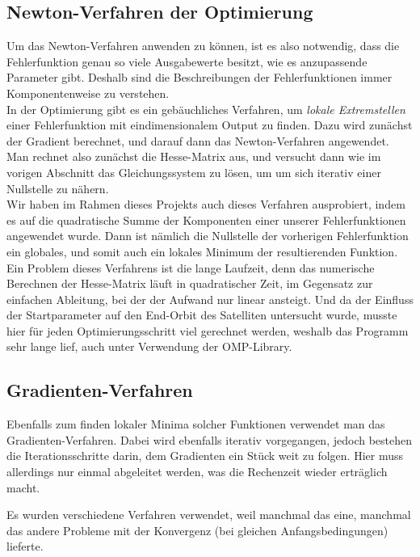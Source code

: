 \subsection{Newton-Verfahren der Optimierung}

Um das Newton-Verfahren anwenden zu können, ist es also notwendig, dass die Fehlerfunktion genau so viele Ausgabewerte besitzt, wie es anzupassende Parameter gibt. Deshalb sind die Beschreibungen der Fehlerfunktionen immer Komponentenweise zu verstehen.\\
In der Optimierung gibt es ein gebäuchliches Verfahren, um \textit{lokale Extremstellen} einer Fehlerfunktion mit eindimensionalem Output zu finden. Dazu wird zunächst der Gradient berechnet, und darauf dann das Newton-Verfahren angewendet. Man rechnet also zunächst die Hesse-Matrix aus, und versucht dann wie im vorigen Abschnitt das Gleichungssystem zu lösen, um um sich iterativ einer Nullstelle zu nähern. \\
Wir haben im Rahmen dieses Projekts auch dieses Verfahren ausprobiert, indem es auf die quadratische Summe der Komponenten einer unserer Fehlerfunktionen angewendet wurde. Dann ist nämlich die Nullstelle der vorherigen Fehlerfunktion ein globales, und somit auch ein lokales Minimum der resultierenden Funktion. \\
Ein Problem dieses Verfahrens ist die lange Laufzeit, denn das numerische Berechnen der Hesse-Matrix läuft in quadratischer Zeit, im Gegensatz zur einfachen Ableitung, bei der der Aufwand nur linear ansteigt. Und da der Einfluss der Startparameter auf den End-Orbit des Satelliten untersucht wurde, musste hier für jeden Optimierungsschritt viel gerechnet werden, weshalb das Programm sehr lange lief, auch unter Verwendung der OMP-Library.


\subsection{Gradienten-Verfahren}

Ebenfalls zum finden lokaler Minima solcher Funktionen verwendet man das Gradienten-Verfahren. Dabei wird ebenfalls iterativ vorgegangen, jedoch bestehen die Iterationsschritte darin, dem Gradienten ein Stück weit zu folgen. Hier muss allerdings nur einmal abgeleitet werden, was die Rechenzeit wieder erträglich macht.

\vspace{1.5cm}

Es wurden verschiedene Verfahren verwendet, weil manchmal das eine, manchmal das andere Probleme mit der Konvergenz (bei gleichen Anfangsbedingungen) lieferte.

